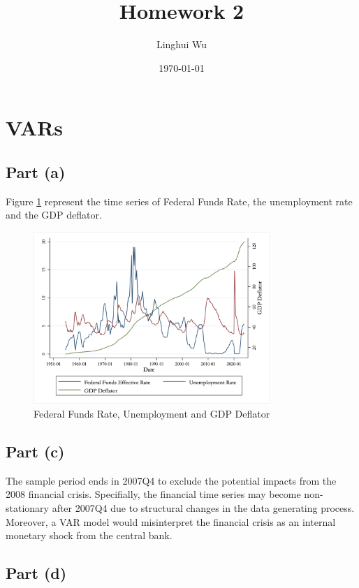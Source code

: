 \documentclass[12pt]{article}
\title{
Homework 2
}
\author{Linghui Wu}
\date{\today}
\begin{document}
\maketitle

\section{VARs}

\subsection*{Part (a)} 

Figure \ref{fig:time_series} represent the time series of Federal Funds Rate, the unemployment rate and the GDP deflator.

\begin{figure}[ht]
    \centering
    \includegraphics[width=0.8\textwidth]{figs/time_series.png}
    \caption{Federal Funds Rate, Unemployment and GDP Deflator}
    \label{fig:time_series}
\end{figure}

\subsection*{Part (c)} 

The sample period ends in 2007Q4 to exclude the potential impacts from the 2008 financial crisis. 
Specifially, the financial time series may become non-stationary after 2007Q4 due to structural changes in the data generating process.
Moreover, a VAR model would misinterpret the financial crisis as an internal monetary shock from the central bank. 

\subsection*{Part (d)} 
\end{document}
